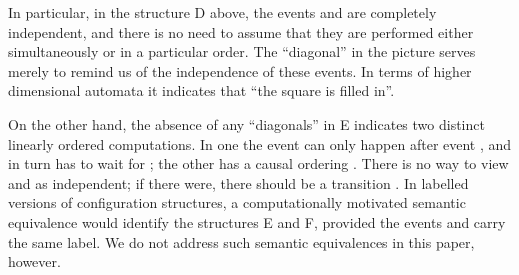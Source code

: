 \documentclass[twocolumn]{article}
\begin{document}
In particular, in the structure D above, the events 
and  are completely independent, and there is no need to assume
that they are performed either simultaneously or in a particular
order.  The ``diagonal'' in the picture serves merely to remind us of
the independence of these events.  In terms of higher dimensional
automata \cite{Pr91a} it indicates that ``the square is filled in''.

On the other hand, the absence of any ``diagonals'' in E indicates two
distinct linearly ordered computations. In one the event  can only
happen after event , and  in turn has to wait for ; the other
has a causal ordering . There is no way to view  and  as
independent; if there were, there should be a transition
.  In labelled versions of
configuration structures, a computationally motivated semantic
equivalence would identify the structures E and F, provided the events
 and  carry the same label. We do not address such semantic
equivalences in this paper, however.
\end{document}
